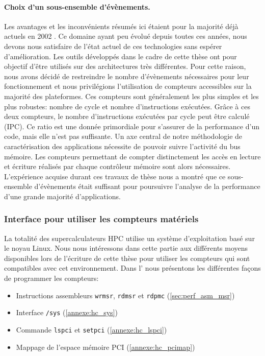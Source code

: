     

        \paragraph{Choix d'un sous-ensemble d'évènements.} 
        
            Les avantages et les inconvénients résumés ici étaient pour la majorité déjà actuels en 2002 \cite{sprunt2002basics}. Ce domaine ayant peu évolué depuis toutes ces années, nous devons nous satisfaire de l'état actuel de ces technologies sans espérer d'amélioration. Les outils développés dans le cadre de cette thèse ont pour objectif d'être utilisés sur des architectures très différentes. Pour cette raison, nous avons décidé de restreindre le nombre d'évènements nécessaires pour leur fonctionnement et nous privilégions l'utilisation de compteurs accessibles sur la majorité des plateformes. Ces compteurs sont généralement les plus simples et les plus robustes: nombre de cycle et nombre d'instructions exécutées. Grâce à ces deux compteurs, le nombre d'instructions exécutées par cycle peut être calculé (IPC). Ce ratio est une donnée primordiale pour s'assurer de la performance d'un code, mais elle n'est pas suffisante. Un axe central de notre méthodologie de caractérisation des applications nécessite de pouvoir suivre l'activité du bus mémoire. Les compteurs permettant de compter distinctement les accès en lecture et écriture réalisés par chaque contrôleur mémoire sont alors nécessaires.
            L'expérience acquise durant ces travaux de thèse nous a montré que ce sous-ensemble d'évènements était suffisant pour poursuivre l'analyse de la performance d'une grande majorité d'applications.     

    
    \subsubsection{Interface pour utiliser les compteurs matériels} \label{sec:edl_monitoring_tools}
        
        La totalité des supercalculateurs HPC utilise un système d'exploitation basé sur le noyau Linux. Nous nous intéressons dans cette partie aux différents moyens disponibles lors de l'écriture de cette thèse pour utiliser les compteurs qui sont compatibles avec cet environnement. Dans l' nous présentons les différentes façons de programmer les compteurs:
        \begin{itemize}
            \item Instructions assembleurs \verb|wrmsr|, \verb|rdmsr| et \verb|rdpmc| (\autoref{sec:perf_asm_msr})
            \item Interface \verb|/sys| (\autoref{annexe:hc_sys})
            \item Commande \verb|lspci| et \verb|setpci| (\autoref{annexe:hc_lspci})
            \item Mappage de l'espace mémoire PCI (\autoref{annexe:hc_pcimap})
        \end{itemize}
 

